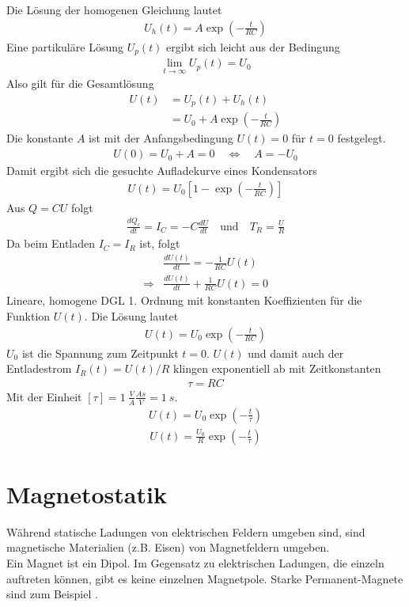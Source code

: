 \documentclass{scrartcl}
\begin{document}
\noindent Die Lösung der homogenen Gleichung lautet 
\begin{align}
    U_h(t)=A\exp\left(-\frac{t}{RC}\right)
\end{align}
Eine partikuläre Lösung $U_p(t)$ ergibt sich leicht aus der Bedingung
\begin{align}
    \lim_{t\to\infty} U_p(t)=U_0
\end{align}
Also gilt für die Gesamtlösung
\begin{align}
    U(t)&=U_p(t)+U_h(t)\\
    &=U_0+A\exp\left(-\frac{t}{RC}\right)
\end{align}
Die konstante $A$ ist mit der Anfangsbedingung $U(t)=0$ für
$t=0$ festgelegt.
\begin{align}
    U(0)=U_0+A=0\quad \Leftrightarrow \quad A=-U_0
\end{align}
Damit ergibt sich die gesuchte Aufladekurve eines Kondensators
\begin{align}
    U(t)=U_0\left[1-\exp\left(-\frac{t}{RC}\right)\right]
\end{align}
Aus $Q=CU$ folgt
\begin{align}
    \frac{dQ_c}{dt}=I_C=-C\frac{dU}{dt} \quad \text{und}\quad T_R=\frac{U}{R}
\end{align}
Da beim Entladen $I_C=I_R$ ist, folgt
\begin{align}
    &\frac{dU(t)}{dt}=-\frac{1}{RC}U(t)\\
    \Rightarrow &\frac{dU(t)}{dt}+\frac{1}{RC}U(t)=0
\end{align}
Lineare, homogene DGL 1. Ordnung mit konstanten Koeffizienten
für die Funktion $U(t)$. Die Lösung lautet 
\begin{align}
    U(t)=U_0\exp\left(-\frac{t}{RC}\right)
\end{align}
$U_0$ ist die Spannung zum Zeitpunkt $t=0$. $U(t)$ und damit auch der Entladestrom
$I_R(t)=U(t)/R$ klingen exponentiell ab mit Zeitkonstanten
\begin{align}
    \tau=RC
\end{align}
Mit der Einheit $[\tau]=\SI{1}{\frac{V}{A}\frac{A s}{V}}=\SI{1}{s}$.
\begin{align}
    U(t)=U_0\exp\left(-\frac{t}{\tau}\right)
\end{align}
\begin{align}
    U(t)=\frac{U_0}{R}\exp\left(-\frac{t}{\tau}\right)
\end{align}


\newpage
\section{Magnetostatik}
Während statische Ladungen von elektrischen Feldern umgeben sind, sind magnetische Materialien
(z.B. Eisen) von Magnetfeldern umgeben.\\
Ein Magnet ist ein Dipol. Im Gegensatz zu elektrischen Ladungen, die einzeln
auftreten können, gibt es keine einzelnen Magnetpole. Starke Permanent-Magnete sind zum Beispiel .\\
\end{document}
